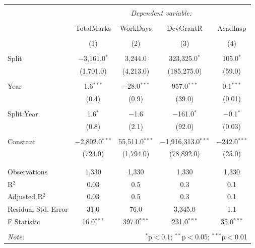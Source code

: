 \documentclass[12pt, a4paper]{article}
\begin{document}
\begin{table}[!htbp] \centering 
  \caption{} 
  \label{} 
\begin{tabular}{@{\extracolsep{5pt}}lcccc} 
\\[-1.8ex]\hline 
\hline \\[-1.8ex] 
 & \multicolumn{4}{c}{\textit{Dependent variable:}} \\ 
\cline{2-5} 
\\[-1.8ex] & TotalMarks & WorkDays & DevGrantR & AcadInsp \\ 
\\[-1.8ex] & (1) & (2) & (3) & (4)\\ 
\hline \\[-1.8ex] 
 Split & $-$3,161.0$^{*}$ & 3,244.0 & 323,325.0$^{*}$ & 105.0$^{*}$ \\ 
  & (1,701.0) & (4,213.0) & (185,275.0) & (59.0) \\ 
  & & & & \\ 
 Year & 1.6$^{***}$ & $-$28.0$^{***}$ & 957.0$^{***}$ & 0.1$^{***}$ \\ 
  & (0.4) & (0.9) & (39.0) & (0.01) \\ 
  & & & & \\ 
 Split:Year & 1.6$^{*}$ & $-$1.6 & $-$161.0$^{*}$ & $-$0.1$^{*}$ \\ 
  & (0.8) & (2.1) & (92.0) & (0.03) \\ 
  & & & & \\ 
 Constant & $-$2,802.0$^{***}$ & 55,511.0$^{***}$ & $-$1,916,313.0$^{***}$ & $-$242.0$^{***}$ \\ 
  & (724.0) & (1,794.0) & (78,892.0) & (25.0) \\ 
  & & & & \\ 
\hline \\[-1.8ex] 
Observations & 1,330 & 1,330 & 1,330 & 1,330 \\ 
R$^{2}$ & 0.03 & 0.5 & 0.3 & 0.1 \\ 
Adjusted R$^{2}$ & 0.03 & 0.5 & 0.3 & 0.1 \\ 
Residual Std. Error & 31.0 & 76.0 & 3,345.0 & 1.1 \\ 
F Statistic & 16.0$^{***}$ & 397.0$^{***}$ & 231.0$^{***}$ & 35.0$^{***}$ \\ 
\hline 
\hline \\[-1.8ex] 
\textit{Note:}  & \multicolumn{4}{r}{$^{*}$p$<$0.1; $^{**}$p$<$0.05; $^{***}$p$<$0.01} \\ 
\end{tabular} 
\end{table} %
\end{document}
